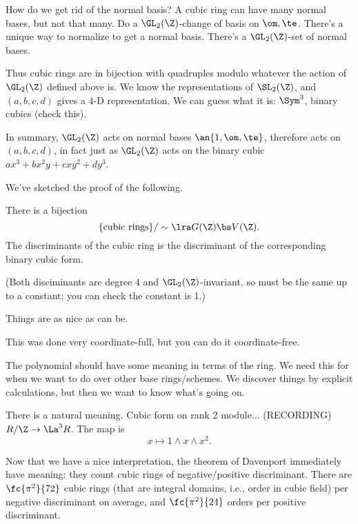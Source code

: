 \begin{enumerate}
How do we get rid of the normal basis? A cubic ring can have many normal bases, but not that many. Do a $\GL_2(\Z)$-change of basis on $\om,\te$. There's a unique way to normalize to get a normal basis. There's a $\GL_2(\Z)$-set of normal bases. 

Thus cubic rings are in bijection with quadruples modulo whatever the action of $\GL_2(\Z)$ defined above is. We 
know the representations of $\SL_2(\Z)$, and $(a,b,c,d)$ gives a 4-D representation. We can guess what it is: $\Sym^3$, binary cubics (check this). 

In summary, $\GL_2(\Z)$ acts on normal bases $\an{1,\om,\te}$, therefore acts on $(a,b,c,d)$, in fact just as $\GL_2(\Z)$ acts on the binary cubic $ax^3+bx^2y + cxy^2 + dy^3$. %
\end{enumerate}
We've sketched the proof of the following.
\begin{thm}
There is a bijection 
\[
\{\textnormal{cubic rings}\}/\sim \lra  G(\Z)\bs V(\Z).
\]
The discriminants of the cubic ring is the discriminant of the corresponding binary cubic form.
\end{thm}
(Both disciminants are degree 4 and $\GL_2(\Z)$-invariant, so must be the same up to a constant; you can check the constant is 1.)

Things are as nice as can be.

This was done very coordinate-full, but you can do it coordinate-free. 

The polynomial should have some meaning in terms of the ring. We need this for when we want to do over other base rings/schemes. We discover things by explicit calculations, but then we want to know what's going on.

There is a natural meaning. Cubic form on rank 2 module... (RECORDING)
$R/\Z\to \La^3 R$. The map is 
\[
x\mapsto 1\wedge x \wedge x^2.
\]

Now that we have a nice interpretation, the theorem of Davenport immediately have meaning: they count cubic rings of negative/positive discriminant. There are $\fc{\pi^2}{72}$ cubic rings (that are integral domains, i.e., order in cubic field) per negative discriminant on average, and $\fc{\pi^2}{24}$ orders per positive discriminant.

